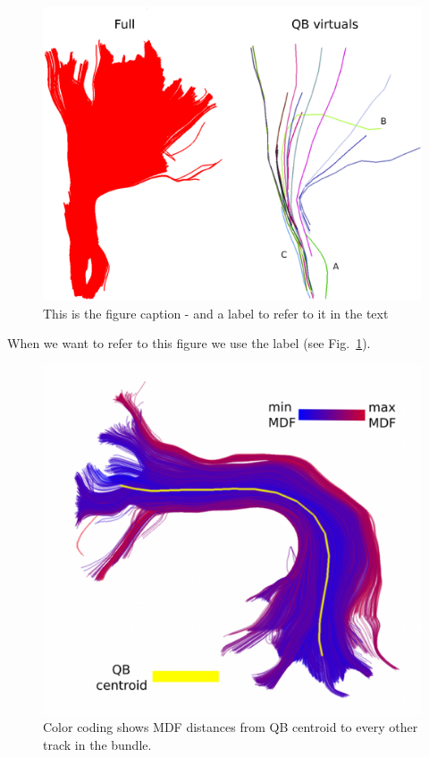 \documentclass{bioinfo}
\begin{document}
\begin{figure}
\centerline{\includegraphics[width=160mm]{Figures/Fig_4_cst_simplification_relabeled_triple.eps}}
\caption{This is the figure caption - and a label to refer to it in the text \label{Fig:big_picture}}
\end{figure}

When we want to refer to this figure we use the label (see
Fig.~\ref{Fig:big_picture}).

\begin{figure}
\includegraphics[scale=0.15]{Figures/Fig_11_MDF_arcuate}
\centering{}
\caption{Color coding shows MDF distances from QB centroid to every
  other track in the bundle.\label{Fig:little_picture}}
\end{figure}
\end{document}
